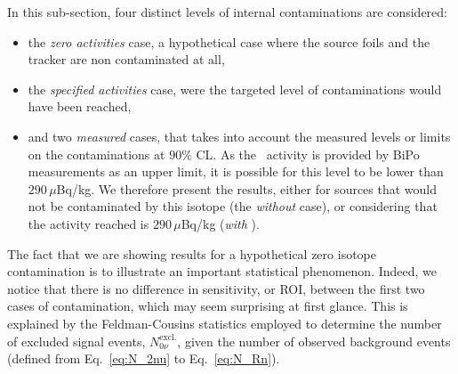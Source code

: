 In this sub-section, four distinct levels of internal contaminations are considered:
\begin{itemize}
\item the \emph{zero activities} case, a hypothetical case where the source foils and the tracker are non contaminated at all,
\item the \emph{specified activities} case, were the targeted level of contaminations would have been reached,
\item and two \emph{measured} cases,  that takes into account the measured levels or limits on the contaminations at $90\%$ CL.
  As the \Bi\ activity is provided by BiPo measurements as an upper limit, it is possible for this level to be lower than $290\,\mu$Bq/kg.
  We therefore present the results, either for sources that would not be contaminated by this isotope (the \emph{without \Bi} case), or considering that the activity reached is $290\,\mu$Bq/kg (\emph{with \Bi}).
\end{itemize}
The fact that we are showing results for a hypothetical zero isotope contamination is to illustrate an important statistical phenomenon.
Indeed, we notice that there is no difference in sensitivity, or ROI, between the first two cases of contamination, which may seem surprising at first glance. %
This is explained by the Feldman-Cousins statistics employed to determine the number of excluded signal events, $N_{0\nu}^{\text{excl.}}$, given the number of observed background events (defined from Eq.~\eqref{eq:N_2nu} to Eq.~\eqref{eq:N_Rn}).

